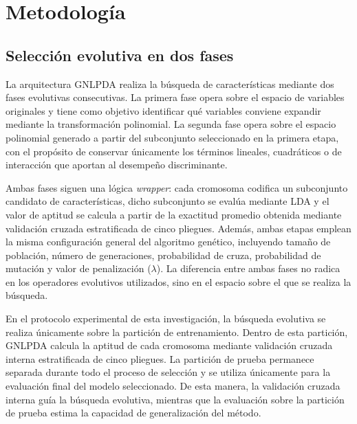 
\chapter{Metodología}
\label{chap:Metodología}

\section{Selección evolutiva en dos fases}


La arquitectura GNLPDA realiza la búsqueda de características mediante dos fases
evolutivas consecutivas. La primera fase opera sobre el espacio de variables originales y tiene como objetivo identificar qué variables conviene expandir mediante la transformación polinomial. La segunda fase opera sobre el espacio polinomial generado a partir del subconjunto seleccionado en la
primera etapa, con el propósito de conservar únicamente los términos lineales, cuadráticos o
de interacción que aportan al desempeño discriminante.

Ambas fases siguen una lógica \textit{wrapper}: cada cromosoma codifica un subconjunto candidato de características, dicho subconjunto se evalúa mediante LDA y el valor de aptitud se calcula a partir de la exactitud promedio obtenida mediante validación cruzada estratificada de cinco pliegues. Además, ambas etapas emplean la misma configuración general del algoritmo genético, incluyendo tamaño de población, número de generaciones, probabilidad de cruza, probabilidad de mutación y valor de penalización ($\lambda$). La diferencia entre ambas fases no radica en los operadores evolutivos utilizados, sino en el espacio sobre el que se realiza la búsqueda.

En el protocolo experimental de esta investigación, la búsqueda evolutiva se realiza
únicamente sobre la partición de entrenamiento. Dentro de esta partición, GNLPDA calcula
la aptitud de cada cromosoma mediante validación cruzada interna estratificada de cinco pliegues. La partición de prueba permanece separada durante todo el proceso de selección y se utiliza únicamente para la evaluación final del modelo seleccionado. De esta manera, la
validación cruzada interna guía la búsqueda evolutiva, mientras que la evaluación sobre la partición de prueba estima la capacidad de generalización del método.

